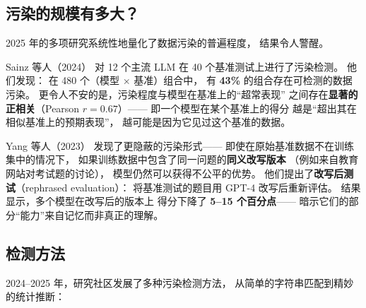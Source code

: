 \subsection{污染的规模有多大？}

2025 年的多项研究系统性地量化了数据污染的普遍程度，
结果令人警醒。

Sainz 等人（2024）%
对 12 个主流 LLM 在 40 个基准测试上进行了污染检测。
他们发现：
在 480 个（模型 $\times$ 基准）组合中，
有 \textbf{43\%} 的组合存在可检测的数据污染。
更令人不安的是，污染程度与模型在基准上的``超常表现''
之间存在\textbf{显著的正相关}（Pearson $r = 0.67$）——
即一个模型在某个基准上的得分
越是``超出其在相似基准上的预期表现''，
越可能是因为它见过这个基准的数据。

Yang 等人（2023）%
发现了更隐蔽的污染形式——
即使在原始基准数据不在训练集中的情况下，
如果训练数据中包含了同一问题的\textbf{同义改写版本}
（例如来自教育网站对考试题的讨论），
模型仍然可以获得不公平的优势。
他们提出了\textbf{改写后测试}（rephrased evaluation）：
将基准测试的题目用 GPT-4 改写后重新评估。
结果显示，多个模型在改写后的版本上
得分下降了 \textbf{5--15 个百分点}——
暗示它们的部分``能力''来自记忆而非真正的理解。

\subsection{检测方法}

2024--2025 年，研究社区发展了多种污染检测方法，
从简单的字符串匹配到精妙的统计推断：

